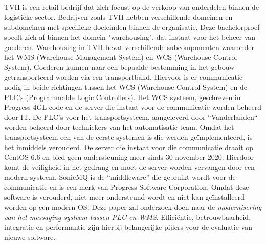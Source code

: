 
\chapter{}%
\label{ch:inleiding}


TVH is een retail bedrijf dat zich focust op de verkoop van onderdelen binnen de logistieke sector. 
Bedrijven zoals TVH hebben verschillende domeinen en subdomeinen met specifieke doeleinden binnen de organisatie. 
Deze bachelorproef speelt zich af binnen het domein "warehousing", dat instaat voor het beheer van goederen.
Warehousing in TVH bevat verschillende subcomponenten waaronder het WMS (Warehouse Management System) en WCS (Warehouse Control System).
Goederen kunnen naar een bepaalde bestemming in het gebouw getransporteerd worden via een transportband.
Hiervoor is er communicatie nodig in beide richtingen tussen het WCS (Warehouse Control System) en de PLC's (Programmable Logic Controllers).
Het WCS systeem, geschreven in Progress 4GL-code en de server die instaat voor de communicatie worden beheerd door IT.
De PLC's voor het transportsysteem, aangeleverd door ``Vanderlanden`` worden beheerd door techniekers van het automatisatie team.
Omdat het transportsysteem een van de eerste systemen is die werden geïmplementeerd, is het inmiddels verouderd. 
De server die instaat voor die communicatie draait op CentOS 6.6 en bied geen ondersteuning meer sinds 30 november 2020.
Hierdoor komt de veiligheid in het gedrang en moet de server worden vervangen door een modern systeem.
SonicMQ is de ``middleware'' die gebruikt wordt voor de communicatie en is een merk van Progress Software Corporation.
Omdat deze software is verouderd, niet meer ondersteund wordt en niet kan geïnstalleerd worden op een modern OS.
Deze paper zal onderzoek doen naar de \emph{modernisering van het messaging systeem tussen PLC en WMS}.
Efficiëntie, betrouwbaarheid, integratie en performantie zijn hierbij belangerijke pijlers voor de evaluatie van nieuwe software.

